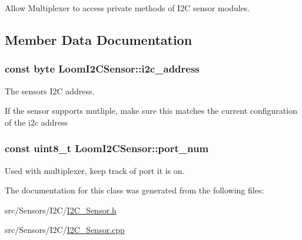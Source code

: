 Allow Multiplexer to access private methods of I2C sensor modules. 



\subsection{Member Data Documentation}
\subsubsection[{\texorpdfstring{i2c\+\_\+address}{i2c_address}}]{\setlength{\rightskip}{0pt plus 5cm}const byte Loom\+I2\+C\+Sensor\+::i2c\+\_\+address\hspace{0.3cm}{\ttfamily [protected]}}\hypertarget{class_loom_i2_c_sensor_a6ff389c1f015152a9ebfccb037d3d90e}{}\label{class_loom_i2_c_sensor_a6ff389c1f015152a9ebfccb037d3d90e}


The sensor\textquotesingle{}s I2C address. 

If the sensor supports mutliple, make sure this matches the current configuration of the i2c address 
\subsubsection[{\texorpdfstring{port\+\_\+num}{port_num}}]{\setlength{\rightskip}{0pt plus 5cm}const uint8\+\_\+t Loom\+I2\+C\+Sensor\+::port\+\_\+num\hspace{0.3cm}{\ttfamily [protected]}}\hypertarget{class_loom_i2_c_sensor_ab5c61951a994a76a2aa2e5400089dad1}{}\label{class_loom_i2_c_sensor_ab5c61951a994a76a2aa2e5400089dad1}


Used with multiplexer, keep track of port it is on. 



The documentation for this class was generated from the following files\+:\begin{DoxyCompactItemize}
\item 
src/\+Sensors/\+I2\+C/\hyperlink{_i2_c___sensor_8h}{I2\+C\+\_\+\+Sensor.\+h}\item 
src/\+Sensors/\+I2\+C/\hyperlink{_i2_c___sensor_8cpp}{I2\+C\+\_\+\+Sensor.\+cpp}\end{DoxyCompactItemize}
